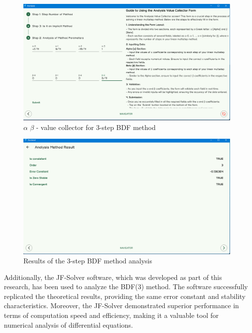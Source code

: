 \begin{figure}[htbp]
    \centering
    \includegraphics[width=1\textwidth]{chapters/4/image/5.png}
    \caption{$\alpha$ $\beta$ - value collector for 3-step BDF method}
\end{figure}

\begin{figure}[htbp]
    \centering
    \includegraphics[width=1\textwidth]{chapters/4/image/6.png}
    \caption{Results of the 3-step BDF method analysis}
\end{figure}

Additionally, the JF-Solver software, which was developed as part of this research, has been used to analyze the BDF(3) method. The software successfully replicated the theoretical results, providing the same error constant and stability characteristics. Moreover, the JF-Solver demonstrated superior performance in terms of computation speed and efficiency, making it a valuable tool for numerical analysis of differential equations.



